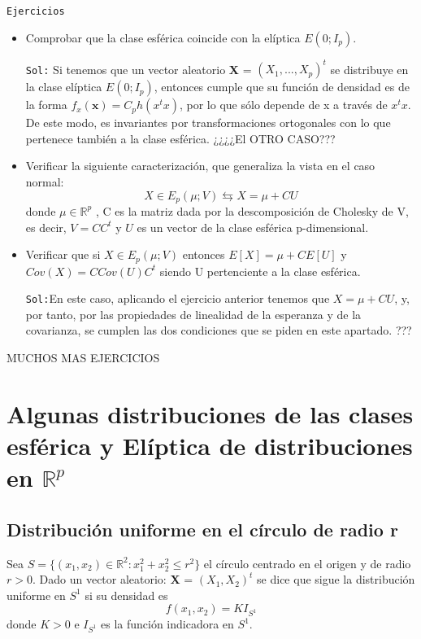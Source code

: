 \documentclass{article}
\theoremstyle{theorem-style}  %
\theoremstyle{definition}
\theoremstyle{example-style}
\begin{document}
	\texttt{Ejercicios}
		\begin{itemize}
			\item Comprobar que la clase esférica coincide con la elíptica $E(0; I_p )$.
			
			\texttt{Sol:} Si tenemos que un vector aleatorio \textbf{X} = $(X_1, ..., X_p)^t$ se distribuye en la clase elíptica $E(0; I_p )$, entonces cumple que su función de densidad es de la forma $f_x(\textbf{x}) = C_p h (x^tx)$, por lo que sólo depende de x a través de $x^tx$. De este modo, es invariantes por transformaciones ortogonales con lo que pertenece también a la clase esférica. ¿¿¿¿El OTRO CASO???
			
			\item Verificar la siguiente caracterización, que generaliza la vista en el caso normal: $$ X \in E_p(\mu; V) \leftrightarrows X = \mu + CU $$ donde $\mu \in \mathbb{R}^p$ , C es la matriz dada por la descomposición de Cholesky de V, es decir, $V=CC^t$ y $U$ es un vector de la clase esférica p-dimensional.
			
			\item Verificar que si $X \in E_p(\mu; V)$  entonces $E[X] = \mu + CE[U]$ y $Cov(X)= C Cov(U)C^t$ siendo U pertenciente a la clase esférica.
			
			\texttt{Sol:}En este caso, aplicando el ejercicio anterior tenemos que  $X=\mu + CU$, y, por tanto, por las propiedades de linealidad de la esperanza y de la covarianza, se cumplen las dos condiciones que se piden en este apartado. ???
		\end{itemize}
	MUCHOS MAS EJERCICIOS
	
	\section{Algunas distribuciones de las clases esférica y Elíptica de distribuciones en $\mathbb{R}^p$ }
	
	\subsection{Distribución uniforme en el círculo de radio r}
	
	Sea $S=\{(x_1, x_2) \in \mathbb{R}^2: x_1^2+x_2^2 \leq r^2\}$ el círculo centrado en el origen y de radio $r>0$. Dado un vector aleatorio: \textbf{X} = $(X_1, X_2)^t$ se dice que sigue la distribución uniforme en $S^1$ si su densidad es $$f(x_1,x_2) = KI_{S^1}$$ donde $K>0$ e $I_{S^1}$ es la función indicadora en $S^1$.
	
\end{document}

